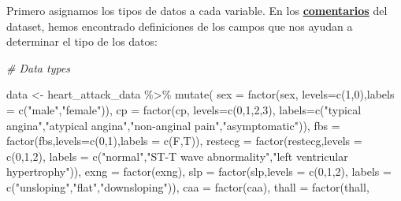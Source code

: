 \documentclass[
]{article}
\newenvironment{Shaded}{\begin{snugshade}}{\end{snugshade}}
\newcommand{\AttributeTok}[1]{\textcolor[rgb]{0.77,0.63,0.00}{#1}}
\newcommand{\CommentTok}[1]{\textcolor[rgb]{0.56,0.35,0.01}{\textit{#1}}}
\newcommand{\DecValTok}[1]{\textcolor[rgb]{0.00,0.00,0.81}{#1}}
\newcommand{\FunctionTok}[1]{\textcolor[rgb]{0.00,0.00,0.00}{#1}}
\newcommand{\NormalTok}[1]{#1}
\newcommand{\OtherTok}[1]{\textcolor[rgb]{0.56,0.35,0.01}{#1}}
\newcommand{\SpecialCharTok}[1]{\textcolor[rgb]{0.00,0.00,0.00}{#1}}
\newcommand{\StringTok}[1]{\textcolor[rgb]{0.31,0.60,0.02}{#1}}
\begin{document}
Primero asignamos los tipos de datos a cada variable. En los
\textbf{\href{https://www.kaggle.com/datasets/rashikrahmanpritom/heart-attack-analysis-prediction-dataset/discussion/329925}{comentarios}}
del dataset, hemos encontrado definiciones de los campos que nos ayudan
a determinar el tipo de los datos:

\begin{Shaded}
\begin{Highlighting}[]
\CommentTok{\# Data types}

\NormalTok{data }\OtherTok{\textless{}{-}}\NormalTok{ heart\_attack\_data }\SpecialCharTok{\%\textgreater{}\%} 
  \FunctionTok{mutate}\NormalTok{(}
    \AttributeTok{sex =} \FunctionTok{factor}\NormalTok{(sex, }\AttributeTok{levels=}\FunctionTok{c}\NormalTok{(}\DecValTok{1}\NormalTok{,}\DecValTok{0}\NormalTok{),}\AttributeTok{labels =} \FunctionTok{c}\NormalTok{(}\StringTok{"male"}\NormalTok{,}\StringTok{"female"}\NormalTok{)),}
    \AttributeTok{cp =} \FunctionTok{factor}\NormalTok{(cp,}
                \AttributeTok{levels=}\FunctionTok{c}\NormalTok{(}\DecValTok{0}\NormalTok{,}\DecValTok{1}\NormalTok{,}\DecValTok{2}\NormalTok{,}\DecValTok{3}\NormalTok{),}
                \AttributeTok{labels=}\FunctionTok{c}\NormalTok{(}\StringTok{"typical angina"}\NormalTok{,}\StringTok{"atypical angina"}\NormalTok{,}\StringTok{"non{-}anginal pain"}\NormalTok{,}\StringTok{"asymptomatic"}\NormalTok{)),}
    \AttributeTok{fbs =} \FunctionTok{factor}\NormalTok{(fbs,}\AttributeTok{levels=}\FunctionTok{c}\NormalTok{(}\DecValTok{0}\NormalTok{,}\DecValTok{1}\NormalTok{),}\AttributeTok{labels =} \FunctionTok{c}\NormalTok{(F,T)),}
    \AttributeTok{restecg =} \FunctionTok{factor}\NormalTok{(restecg,}\AttributeTok{levels =} \FunctionTok{c}\NormalTok{(}\DecValTok{0}\NormalTok{,}\DecValTok{1}\NormalTok{,}\DecValTok{2}\NormalTok{),}
                     \AttributeTok{labels =} \FunctionTok{c}\NormalTok{(}\StringTok{"normal"}\NormalTok{,}\StringTok{"ST{-}T wave abnormality"}\NormalTok{,}\StringTok{"left ventricular hypertrophy"}\NormalTok{)),}
    \AttributeTok{exng =} \FunctionTok{factor}\NormalTok{(exng),}
    \AttributeTok{slp =} \FunctionTok{factor}\NormalTok{(slp,}\AttributeTok{levels =} \FunctionTok{c}\NormalTok{(}\DecValTok{0}\NormalTok{,}\DecValTok{1}\NormalTok{,}\DecValTok{2}\NormalTok{),}
                 \AttributeTok{labels =} \FunctionTok{c}\NormalTok{(}\StringTok{"unsloping"}\NormalTok{,}\StringTok{"flat"}\NormalTok{,}\StringTok{"downsloping"}\NormalTok{)),}
    \AttributeTok{caa =} \FunctionTok{factor}\NormalTok{(caa),}
    \AttributeTok{thall =} \FunctionTok{factor}\NormalTok{(thall, }

\end{Highlighting}
\end{Shaded}
\end{document}
